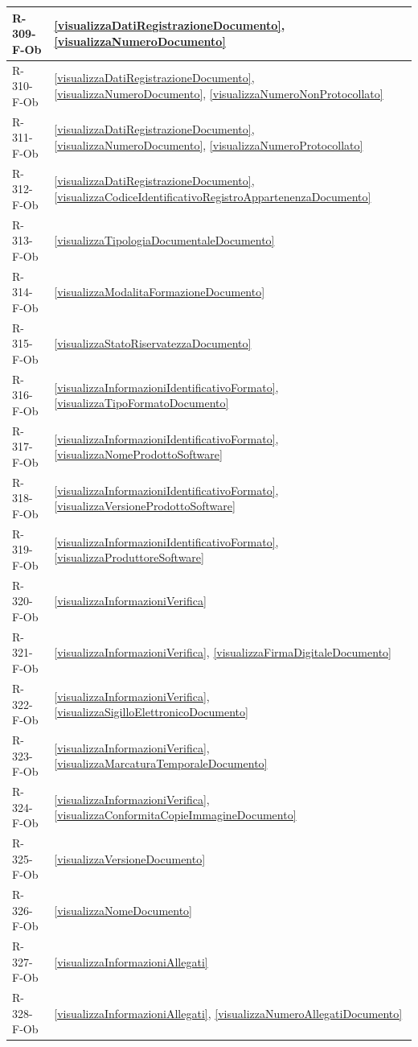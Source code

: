 \begin{longtable}{|p{4cm}|p{10cm}|}
\hline
R-309-F-Ob & \ref{visualizzaDatiRegistrazioneDocumento}, \ref{visualizzaNumeroDocumento} \\
\hline
R-310-F-Ob & \ref{visualizzaDatiRegistrazioneDocumento}, \ref{visualizzaNumeroDocumento}, \ref{visualizzaNumeroNonProtocollato} \\
\hline
R-311-F-Ob & \ref{visualizzaDatiRegistrazioneDocumento}, \ref{visualizzaNumeroDocumento}, \ref{visualizzaNumeroProtocollato} \\
\hline
R-312-F-Ob & \ref{visualizzaDatiRegistrazioneDocumento}, \ref{visualizzaCodiceIdentificativoRegistroAppartenenzaDocumento} \\
\hline
R-313-F-Ob & \ref{visualizzaTipologiaDocumentaleDocumento} \\
\hline
R-314-F-Ob & \ref{visualizzaModalitaFormazioneDocumento} \\
\hline
R-315-F-Ob & \ref{visualizzaStatoRiservatezzaDocumento} \\
\hline
R-316-F-Ob & \ref{visualizzaInformazioniIdentificativoFormato}, \ref{visualizzaTipoFormatoDocumento} \\
\hline
R-317-F-Ob & \ref{visualizzaInformazioniIdentificativoFormato}, \ref{visualizzaNomeProdottoSoftware} \\
\hline
R-318-F-Ob & \ref{visualizzaInformazioniIdentificativoFormato}, \ref{visualizzaVersioneProdottoSoftware} \\
\hline
R-319-F-Ob & \ref{visualizzaInformazioniIdentificativoFormato}, \ref{visualizzaProduttoreSoftware} \\
\hline
R-320-F-Ob & \ref{visualizzaInformazioniVerifica} \\
\hline
R-321-F-Ob & \ref{visualizzaInformazioniVerifica}, \ref{visualizzaFirmaDigitaleDocumento} \\
\hline
R-322-F-Ob & \ref{visualizzaInformazioniVerifica}, \ref{visualizzaSigilloElettronicoDocumento} \\
\hline
R-323-F-Ob & \ref{visualizzaInformazioniVerifica}, \ref{visualizzaMarcaturaTemporaleDocumento} \\
\hline
R-324-F-Ob & \ref{visualizzaInformazioniVerifica}, \ref{visualizzaConformitaCopieImmagineDocumento} \\
\hline
R-325-F-Ob & \ref{visualizzaVersioneDocumento} \\
\hline
R-326-F-Ob & \ref{visualizzaNomeDocumento} \\
\hline
R-327-F-Ob & \ref{visualizzaInformazioniAllegati} \\
\hline
R-328-F-Ob & \ref{visualizzaInformazioniAllegati}, \ref{visualizzaNumeroAllegatiDocumento} \\

\end{longtable}
